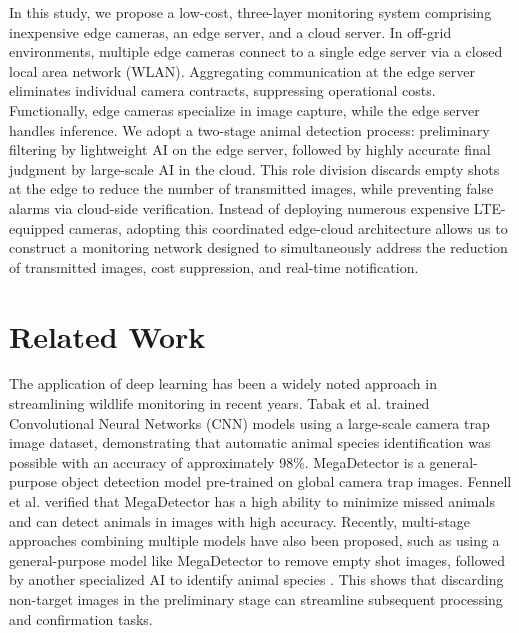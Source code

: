 \documentclass[conference]{IEEEtran}
\begin{document}
In this study, we propose a low-cost, three-layer monitoring system comprising inexpensive edge cameras, an edge server, and a cloud server. In off-grid environments, multiple edge cameras connect to a single edge server via a closed local area network (WLAN). Aggregating communication at the edge server eliminates individual camera contracts, suppressing operational costs. Functionally, edge cameras specialize in image capture, while the edge server handles inference. We adopt a two-stage animal detection process: preliminary filtering by lightweight AI on the edge server, followed by highly accurate final judgment by large-scale AI in the cloud. This role division discards empty shots at the edge to reduce the number of transmitted images, while preventing false alarms via cloud-side verification. Instead of deploying numerous expensive LTE-equipped cameras, adopting this coordinated edge-cloud architecture allows us to construct a monitoring network designed to simultaneously address the reduction of transmitted images, cost suppression, and real-time notification.



\section{Related Work}

The application of deep learning has been a widely noted approach in streamlining wildlife monitoring in recent years. Tabak et al. \cite{Tabak2019} trained Convolutional Neural Networks (CNN) models using a large-scale camera trap image dataset, demonstrating that automatic animal species identification was possible with an accuracy of approximately 98\%. MegaDetector \cite{Beery2019} is a general-purpose object detection model pre-trained on global camera trap images. Fennell et al. \cite{Fennell2022} verified that MegaDetector has a high ability to minimize missed animals and can detect animals in images with high accuracy. Recently, multi-stage approaches combining multiple models have also been proposed, such as using a general-purpose model like MegaDetector to remove empty shot images, followed by another specialized AI to identify animal species \cite{rs18030502,Mulero2025}. This shows that discarding non-target images in the preliminary stage can streamline subsequent processing and confirmation tasks.
\end{document}
